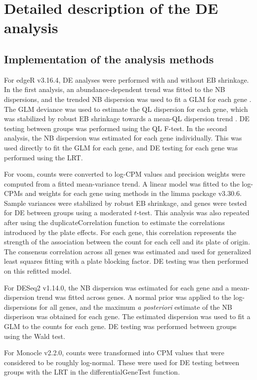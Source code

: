 \documentclass{article}
\newcommand\revised[1]{#1} %
\begin{document}
\section{Detailed description of the DE analysis}

\subsection{Implementation of the analysis methods}
For edgeR v3.16.4, DE analyses were performed with and without EB shrinkage.
In the first analysis, an abundance-dependent trend was fitted to the NB dispersions, and the trended NB dispersion was used to fit a \revised{GLM} for each gene \citep{mccarthy2012differential}.
The GLM deviance was used to estimate the QL dispersion for each gene, which was stabilized by robust EB shrinkage towards a mean-QL dispersion trend \citep{lund2012detecting,phipson2016robust}.
DE testing between groups was performed using the QL F-test.
In the second analysis, the NB dispersion was estimated for each gene individually.
This was used directly to fit the GLM for each gene, and DE testing for each gene was performed using the LRT.

For voom, counts were converted to log-CPM values and precision weights were computed from a fitted mean-variance trend.
A linear model was fitted to the log-CPMs and weights for each gene using methods in the limma package v3.30.6.
Sample variances were stabilized by robust EB shrinkage, and genes were tested for DE between groups using a moderated $t$-test.
This analysis was also repeated after using the duplicateCorrelation function \citep{smyth2005use} to estimate the correlations introduced by the plate effects.
For each gene, this correlation represents the strength of the association between the count for each cell and its plate of origin.
The consensus correlation across all genes was estimated and used for generalized least squares fitting with a plate blocking factor.
DE testing was then performed on this refitted model.

For DESeq2 v1.14.0, the NB dispersion was estimated for each gene and a mean-dispersion trend was fitted across genes.
A normal prior was applied to the log-dispersions for all genes, and the maximum \textit{a posteriori} estimate of the NB disperison was obtained for each gene.
The estimated dispersion was used to fit a GLM to the counts for each gene.
DE testing was performed between groups using the Wald test.

For Monocle v2.2.0, counts were transformed into CPM values that were considered to be roughly log-normal.
These were used for DE testing between groups with the LRT in the differentialGeneTest function.
\end{document}

